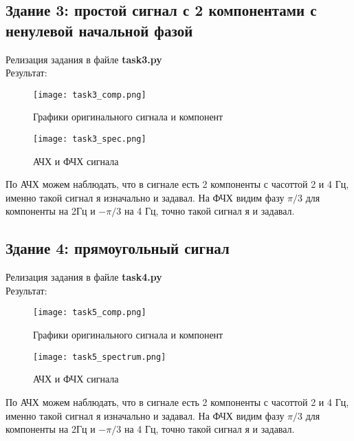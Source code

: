 \subsection*{\textbf{Здание 3: простой сигнал с 2 компонентами с ненулевой начальной фазой}}

Релизация задания в файле \textbf{task3.py} \\

Результат: \\

\begin{figure}[H]
    \centering
    \texttt{[image: task3\_comp.png]}
    \caption{Графики оригинального сигнала и компонент}
\end{figure}

\begin{figure}[H]
    \centering
    \texttt{[image: task3\_spec.png]}
    \caption{АЧХ и ФЧХ сигнала}
\end{figure}

По АЧХ можем наблюдать, что в сигнале есть 2 компоненты с часоттой 2 и 4 Гц, именно такой сигнал
я изначально и задавал. На ФЧХ видим фазу $\pi/3$ для компоненты на 2Гц и $-\pi/3$ на 4 Гц, точно такой
сигнал я и задавал.

\subsection*{\textbf{Здание 4: прямоугольный сигнал}}

Релизация задания в файле \textbf{task4.py} \\

Результат: \\

\begin{figure}[H]
    \centering
    \texttt{[image: task5\_comp.png]}
    \caption{Графики оригинального сигнала и компонент}
\end{figure}

\begin{figure}[H]
    \centering
    \texttt{[image: task5\_spectrum.png]}
    \caption{АЧХ и ФЧХ сигнала}
\end{figure}

По АЧХ можем наблюдать, что в сигнале есть 2 компоненты с часоттой 2 и 4 Гц, именно такой сигнал
я изначально и задавал. На ФЧХ видим фазу $\pi/3$ для компоненты на 2Гц и $-\pi/3$ на 4 Гц, точно такой
сигнал я и задавал. \\

